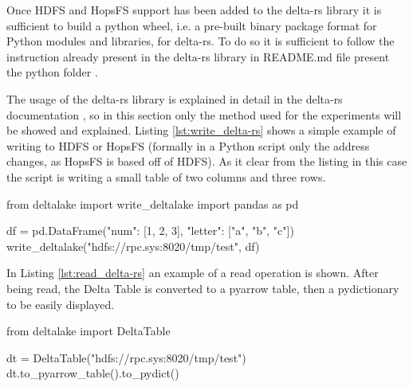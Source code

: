 Once \gls{HDFS} and \gls{HopsFS} support has been added to the delta-rs library it is sufficient to build a python wheel, i.e. a pre-built binary package format for Python modules and libraries, for delta-rs. To do so it is sufficient to follow the instruction already present in the delta-rs library in README.md file present the python folder \cite{DeltarsPythonMain}.

The usage of the delta-rs library is explained in detail in the delta-rs documentation \cite{DeltaioDeltars2024}, so in this section only the method used for the experiments will be showed and explained. Listing \ref{lst:write_delta-rs} shows a simple example of writing to \gls{HDFS} or \gls{HopsFS} (formally in a Python script only the address changes, as \gls{HopsFS} is based off of \gls{HDFS}). As it clear from the listing in this case the script is writing a small table of two columns and three rows.

\begin{python}[caption={Writing a dataframe on a Delta Table with delta-rs on \gls{HDFS} or \gls{HopsFS}}, label={lst:write_delta-rs}]
from deltalake import write_deltalake
import pandas as pd

df = pd.DataFrame({"num": [1, 2, 3], 
                   "letter": ["a", "b", "c"]})
write_deltalake("hdfs://rpc.sys:8020/tmp/test", df)
\end{python}
\medskip

In Listing \ref{lst:read_delta-rs} an example of a read operation is shown. After being read, the Delta Table is converted to a pyarrow table, then a pydictionary to be easily displayed.

\begin{python}[caption={Reading a dataframe on a Delta Table with delta-rs on \gls{HDFS} or \gls{HopsFS}}, label={lst:read_delta-rs}]
from deltalake import DeltaTable

dt = DeltaTable("hdfs://rpc.sys:8020/tmp/test")
dt.to_pyarrow_table().to_pydict()
\end{python}